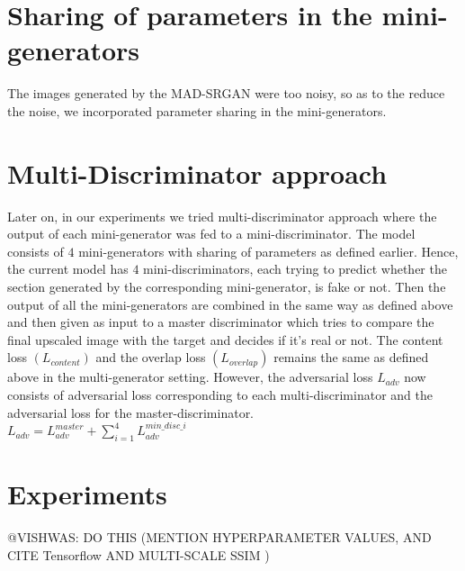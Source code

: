 \documentclass[12pt,a4paper,twocolumn]{article}
\begin{document}
    \section{Sharing of parameters in the mini-generators}
    The images generated by the MAD-SRGAN were too noisy, so as to the reduce the noise, we incorporated parameter sharing in the mini-generators.

    \section{Multi-Discriminator approach}
     Later on, in our experiments we tried multi-discriminator approach where the output of each mini-generator was fed to a mini-discriminator. The model consists of $4$ mini-generators with sharing of parameters as defined earlier. Hence, the current model has $4$ mini-discriminators, each trying to predict whether the section generated by the corresponding mini-generator, is fake or not. Then the output of all the mini-generators are combined in the same way as defined above and then given as input to a master discriminator which tries to compare the final upscaled image with the target and decides if it's real or not. The content loss $(L_{content})$ and the overlap loss $(L_{overlap})$ remains the same as defined above in the multi-generator setting. However, the adversarial loss $L_{adv}$ now  consists of adversarial loss corresponding to each multi-discriminator and the adversarial loss for the master-discriminator.\\
        $L_{adv} = L_{adv}^{master} + \sum_{i=1}^{4}L_{adv}^{min\_disc\_i}$

    \section{Experiments}
        @VISHWAS: DO THIS (MENTION HYPERPARAMETER VALUES, AND CITE Tensorflow \cite{tensorflow} AND MULTI-SCALE SSIM \cite{msssim})
\end{document}
